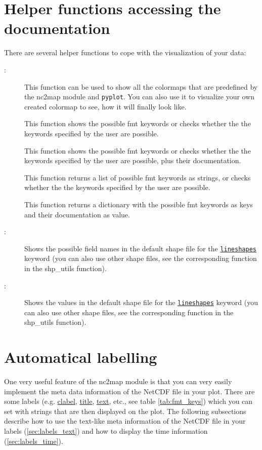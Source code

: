 \section{Helper functions accessing the documentation} \label{sec:helper}
There are several helper functions to cope with the visualization of your data:
\begin{description}
	\item[:] This function can be used to show all the colormaps that are predefined by the \gls{nc2map} module and \lstinline|pyplot|. You can also use it to visualize your own created colormap to see, how it will finally look like.
	\item[] This function shows the possible \gls{fmt} keywords or checks whether the the keywords specified by the user are possible.
	\item[] This function shows the possible \gls{fmt} keywords or checks whether the the keywords specified by the user are possible, plus their documentation.
	\item[] This function returns a list of possible \gls{fmt} keywords as strings, or checks whether the the keywords specified by the user are possible.
	\item[] This function returns a dictionary with the possible \gls{fmt} keywords as keys and their documentation as value.
	\item[:] Shows the possible field names in the default shape file for the \hyperref[item:lineshapes]{\lstinline|lineshapes|} keyword (you can also use other shape files, see the corresponding function in the \gls{shp_utils} function).
	\item[:] Shows the values in the default shape file for the \hyperref[item:lineshapes]{\lstinline|lineshapes|} keyword (you can also use other shape files, see the corresponding function in the \gls{shp_utils} function).
\end{description}

\section{Automatical labelling} \label{sec:labels}
One very useful feature of the \gls{nc2map} module is that you can very easily implement the meta data information of the NetCDF file in your plot. There are some labels (e.g. \hyperref[item:clabel]{clabel}, \hyperref[item:title]{title}, \hyperref[item:text]{text}, etc., see table \ref{tab:fmt_keys}) which you can set with strings that are then displayed on the plot. The following subsections describe how to use the text-like meta information of the NetCDF file in your labels (\autoref{sec:labels_text}) and how to display the time information (\autoref{sec:labels_time}).

